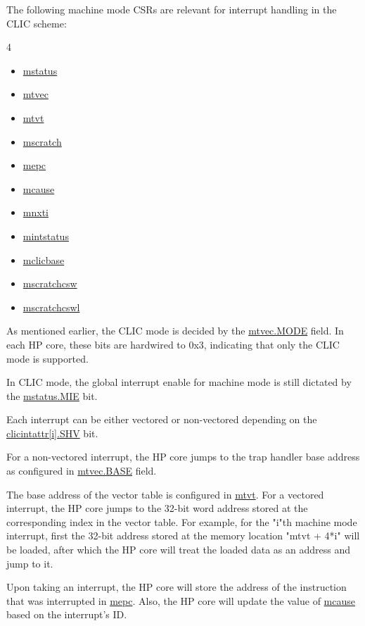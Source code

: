 \documentclass[main\_\_EN.tex]{subfiles}
\begin{document}
The following machine mode CSRs are relevant for interrupt handling in the CLIC scheme:

\begin{multicols}{4}
\begin{itemize}
\item \hyperref[regdesc:MSTATUS]{mstatus}
\item \hyperref[regdesc:MTVEC]{mtvec}
\item \hyperref[regdesc:MTVT]{mtvt}
\item \hyperref[regdesc:MSCRATCH]{mscratch}
\item \hyperref[regdesc:MEPC]{mepc}
\item \hyperref[regdesc:MCAUSE]{mcause}
\item \hyperref[regdesc:MNXTI_REG]{mnxti}
\item \hyperref[regdesc:MINTSTATUS]{mintstatus}
\item \hyperref[regdesc:MCLICBASE_REG]{mclicbase}
\item \hyperref[regdesc:MSCRATCHCSW_REG]{mscratchcsw}
\item \hyperref[regdesc:MSCRATCHCSWL_REG]{mscratchcswl}
\end{itemize}
\end{multicols}


As mentioned earlier, the CLIC mode is decided by the \hyperref[fielddesc:MTVECMODE]{mtvec.MODE} field. In each HP core, these bits are hardwired to 0x3, indicating that only the CLIC mode is supported.

In CLIC mode, the global interrupt enable for machine
mode is still dictated by the \hyperref[fielddesc:MSTATUSMIE]{mstatus.MIE} bit.


Each interrupt can be either vectored or non-vectored depending on the \hyperref[fielddesc:MCLICINTATTR_i_SHV]{clicintattr[i].SHV} bit.

For a non-vectored interrupt, the HP core jumps to the trap handler base address as configured in \hyperref[fielddesc:MTVECBASE]{mtvec.BASE} field.

The base address of the vector table is configured in \hyperref[regdesc:MTVT]{mtvt}.
For a vectored interrupt, the HP core jumps to the 32-bit word address stored at the corresponding index in the vector table.
For example, for the "i"th machine mode interrupt, first the 32-bit address stored at the memory location "mtvt + 4*i" will be loaded, after which the HP core will treat the loaded data as an address and jump to it.

Upon taking an interrupt, the HP core will store the address of the instruction that was interrupted in \hyperref[regdesc:MEPC]{mepc}.
Also, the HP core will update the value of \hyperref[regdesc:MCAUSE]{mcause}
based on the interrupt's ID.
\end{document}
